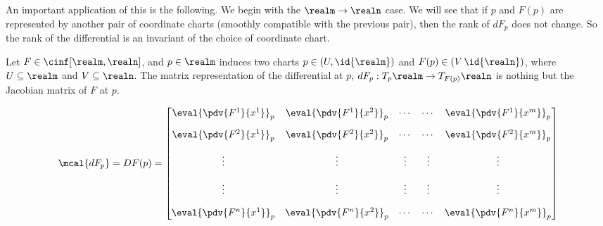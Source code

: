 \documentclass[../main-v2-manifolds.tex]{subfiles}
\begin{document}

An important application of this is the following. We begin with the $\realm\to\realn$ case. We will see that if $p$ and $F(p)$ are represented by another pair of coordinate charts (smoothly compatible with the previous pair), then the rank of $dF_p$ does not change. So the rank of the differential is an invariant of the choice of coordinate chart.

\begin{definition}
Let $F\in \cinf[\realm,\realn]$, and $p\in\realm$ induces two charts $p\in (U,\id{\realm})$ and $F(p)\in(V\,\id{\realn})$, where $U\subseteq\realm$ and $V\subseteq\realn$. The matrix representation of the differential at $p$, $dF_p: T_p\realm\to T_{F(p)}\realn$ is nothing but the Jacobian matrix of $F$ at $p$.

\begin{equation}\label{lee-chap3:euclidean-differential-jacobian}
    \mcal\{dF_p\} = DF(p) = \begin{bmatrix}
        \eval{\pdv{F^1}{x^1}}_{p} & \eval{\pdv{F^1}{x^2}}_{p} & \cdots & \cdots & \eval{\pdv{F^1}{x^m}}_{p} \\[1em] \eval{\pdv{F^2}{x^1}}_{p} & \eval{\pdv{F^2}{x^2}}_{p} & \cdots & \cdots & \eval{\pdv{F^2}{x^m}}_{p} \\[1em] \vdots & \vdots & \vdots & \vdots & \vdots \\[1em] \vdots & \vdots & \vdots & \vdots & \vdots \\[1em] \eval{\pdv{F^n}{x^1}}_{p} & \eval{\pdv{F^n}{x^2}}_{p} & \cdots & \cdots & \eval{\pdv{F^n}{x^m}}_{p}
    \end{bmatrix}
\end{equation}

\end{definition}
\end{document}
